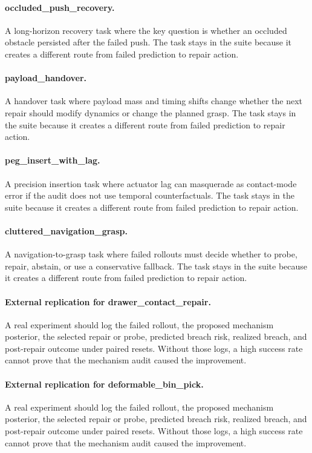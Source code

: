 \documentclass{article}
\begin{document}
\paragraph{occluded\_push\_recovery.} A long-horizon recovery task where the key question is whether an occluded obstacle persisted after the failed push. The task stays in the suite because it creates a different route from failed prediction to repair action.
\paragraph{payload\_handover.} A handover task where payload mass and timing shifts change whether the next repair should modify dynamics or change the planned grasp. The task stays in the suite because it creates a different route from failed prediction to repair action.
\paragraph{peg\_insert\_with\_lag.} A precision insertion task where actuator lag can masquerade as contact-mode error if the audit does not use temporal counterfactuals. The task stays in the suite because it creates a different route from failed prediction to repair action.
\paragraph{cluttered\_navigation\_grasp.} A navigation-to-grasp task where failed rollouts must decide whether to probe, repair, abstain, or use a conservative fallback. The task stays in the suite because it creates a different route from failed prediction to repair action.
\paragraph{External replication for drawer\_contact\_repair.} A real experiment should log the failed rollout, the proposed mechanism posterior, the selected repair or probe, predicted breach risk, realized breach, and post-repair outcome under paired resets. Without those logs, a high success rate cannot prove that the mechanism audit caused the improvement.
\paragraph{External replication for deformable\_bin\_pick.} A real experiment should log the failed rollout, the proposed mechanism posterior, the selected repair or probe, predicted breach risk, realized breach, and post-repair outcome under paired resets. Without those logs, a high success rate cannot prove that the mechanism audit caused the improvement.
\end{document}
